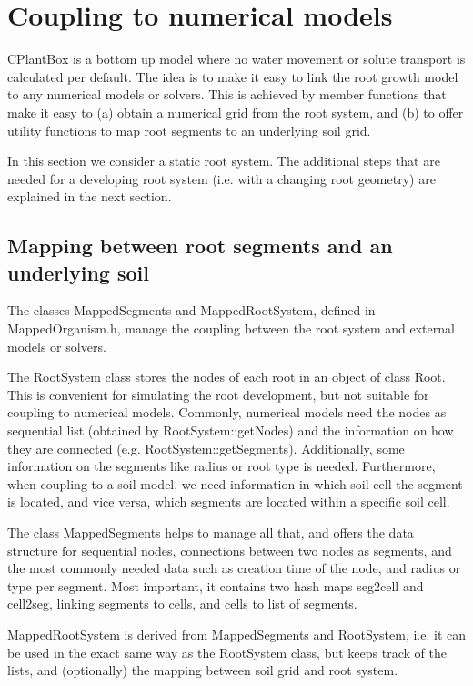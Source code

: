 \newpage
\section{Coupling to numerical models}

CPlantBox is a bottom up model where no water movement or solute transport is calculated per default. The idea is to make it easy to link the root growth model to any numerical models or solvers. This is achieved by member functions that make it easy to (a) obtain a numerical grid from the root system, and (b) to offer utility functions to map root segments to an underlying soil grid. 

In this section we consider a static root system. The additional steps that are needed for a developing root system (i.e. with a changing root geometry) are explained in the next section. 

\subsection{Mapping between root segments and an underlying soil} \label{ss:mapping}

The classes MappedSegments and MappedRootSystem, defined in MappedOrganism.h, manage the coupling between the root system and external models or solvers. 

The RootSystem class stores the nodes of each root in an object of class Root. This is convenient for simulating the root development, but not suitable for coupling to numerical models. Commonly, numerical models need the nodes as sequential list (obtained by RootSystem::getNodes) and the information on how they are connected (e.g. RootSystem::getSegments). Additionally, some information on the segments like radius or root type is needed. Furthermore, when coupling to a soil model, we need information in which soil cell the segment is located, and vice versa, which segments are located within a specific soil cell. 

The class MappedSegments helps to manage all that, and offers the data structure for sequential nodes, connections between two nodes as segments, and the most commonly needed data such as creation time of the node, and radius or type per segment. Most important, it contains two hash maps seg2cell and cell2seg, linking segments to cells, and cells to list of segments.

MappedRootSystem is derived from MappedSegments and RootSystem, i.e. it can be used in the exact same way as the RootSystem class, but keeps track of the lists, and (optionally) the mapping between soil grid and root system.

